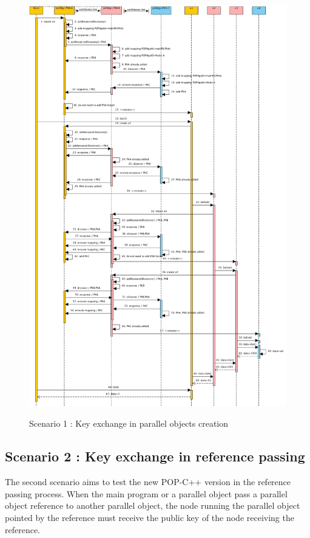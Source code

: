 \begin{figure}[ht]
	\caption{Scenario 1 : Key exchange in parallel objects creation}
  	\centering
	\includegraphics[scale=0.35]{../ke_creation.jpg}
	\label{fig:ke_creation}
\end{figure}
\clearpage

\subsection{Scenario 2 : Key exchange in reference passing}
The second scenario aims to test the new POP-C++ version in the reference passing process. When the main program or a parallel object pass a parallel object reference to another parallel object, the node running the parallel object pointed by the reference must receive the public key of the node receiving the reference.\s

